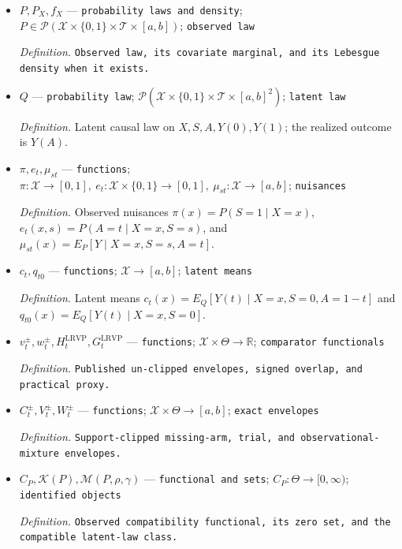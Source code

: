 \documentclass{article}
\begin{document}
\begin{itemize}
  \item \(P,P_X,f_X\) --- \texttt{probability laws and density}; \(P\in\mathcal P(\mathcal X\times\{0,1\}\times\mathcal T\times[a,b])\); \texttt{observed law}
  \par\smallskip\noindent\emph{Definition.} \texttt{Observed law,\allowbreak{} its covariate marginal,\allowbreak{} and its Lebesgue density when it exists.}
  \item \(Q\) --- \texttt{probability law}; \(\mathcal P(\mathcal X\times\{0,1\}\times\mathcal T\times[a,b]^2)\); \texttt{latent law}
  \par\smallskip\noindent\emph{Definition.} Latent causal law on \(X,S,A,Y(0),Y(1)\); the realized outcome is \(Y(A)\).
  \item \(\pi,e_t,\mu_{st}\) --- \texttt{functions}; \(\pi:\mathcal X\to[0,1],\ e_t:\mathcal X\times\{0,1\}\to[0,1],\ \mu_{st}:\mathcal X\to[a,b]\); \texttt{nuisances}
  \par\smallskip\noindent\emph{Definition.} Observed nuisances \(\pi(x)=P(S=1\mid X=x)\), \(e_t(x,s)=P(A=t\mid X=x,S=s)\), and \(\mu_{st}(x)=E_P[Y\mid X=x,S=s,A=t]\).
  \item \(c_t,q_{t0}\) --- \texttt{functions}; \(\mathcal X\to[a,b]\); \texttt{latent means}
  \par\smallskip\noindent\emph{Definition.} Latent means \(c_t(x)=E_Q[Y(t)\mid X=x,S=0,A=1-t]\) and \(q_{t0}(x)=E_Q[Y(t)\mid X=x,S=0]\).
  \item \(v_t^\pm,w_t^\pm,H_t^{\mathrm{LRVP}},G_t^{\mathrm{LRVP}}\) --- \texttt{functions}; \(\mathcal X\times\Theta\to\mathbb R\); \texttt{comparator functionals}
  \par\smallskip\noindent\emph{Definition.} \texttt{Published un-\allowbreak{}clipped envelopes,\allowbreak{} signed overlap,\allowbreak{} and practical proxy.}
  \item \(C_t^\pm,V_t^\pm,W_t^\pm\) --- \texttt{functions}; \(\mathcal X\times\Theta\to[a,b]\); \texttt{exact envelopes}
  \par\smallskip\noindent\emph{Definition.} \texttt{Support-\allowbreak{}clipped missing-\allowbreak{}arm,\allowbreak{} trial,\allowbreak{} and observational-\allowbreak{}mixture envelopes.}
  \item \(C_P,\mathcal K(P),\mathcal M(P,\rho,\gamma)\) --- \texttt{functional and sets}; \(C_P:\Theta\to[0,\infty)\); \texttt{identified objects}
  \par\smallskip\noindent\emph{Definition.} \texttt{Observed compatibility functional,\allowbreak{} its zero set,\allowbreak{} and the compatible latent-\allowbreak{}law class.}

\end{itemize}
\end{document}
